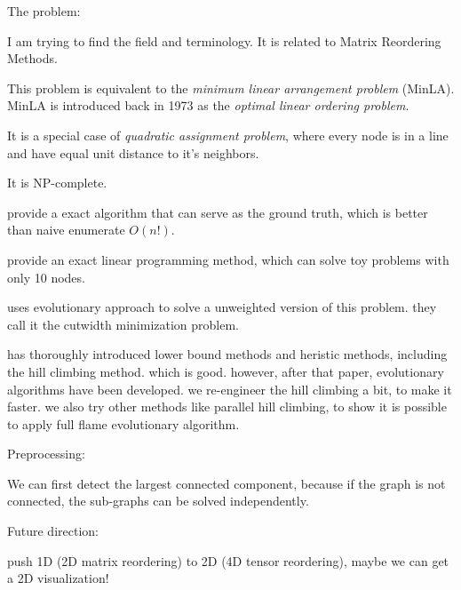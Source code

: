 The problem:

I am trying to find the field and terminology.
It is related to Matrix Reordering Methods. \cite{behrisch_matrix_2016}

This problem is equivalent to the \emph{minimum linear arrangement problem} (MinLA). \cite{goos_multi-scale_2002}
MinLA is introduced back in 1973 as the \emph{optimal linear ordering problem}. \cite{adolphson_optimal_1973}

It is a special case of \emph{quadratic assignment problem}, where every node is in a line and have equal unit distance to it's neighbors.

It is NP-complete. \cite{garey_simplified_1976}

\cite{goos_multi-scale_2002} provide a exact algorithm that can serve as the ground truth, which is better than naive enumerate $O(n!)$.

\cite{andrade_minimum_2017} provide an exact linear programming method, which can solve toy problems with only 10 nodes.

\cite{pantrigo_scatter_2012} uses evolutionary approach to solve a unweighted version of this problem. they call it the cutwidth minimization problem.

\cite{petit_experiments_2004} has thoroughly introduced lower bound methods and heristic methods, including the hill climbing method. which is good.
however, after that paper, evolutionary algorithms have been developed.
we re-engineer the hill climbing a bit, to make it faster.
we also try other methods like parallel hill climbing, to show it is possible to apply full flame evolutionary algorithm.


Preprocessing:

We can first detect the largest connected component, because if the graph is not connected, the sub-graphs can be solved independently.

Future direction:

push 1D (2D matrix reordering) to 2D (4D tensor reordering), maybe we can get a 2D visualization!
